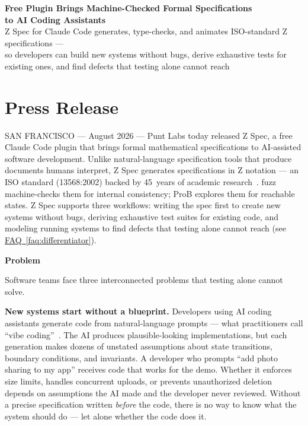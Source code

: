 \documentclass[11pt,letterpaper]{article}
\newcommand{\prsection}[1]{%
  \vspace{1em}%
  {\large\bfseries\color{SectionBlue}#1}%
  \vspace{0.3em}\par%
}
\newcommand{\faqref}[1]{\hyperref[#1]{FAQ~\ref*{#1}}}
\begin{document}
\begin{center}
  {\LARGE\bfseries\color{SectionBlue} Free Plugin Brings Machine-Checked Formal Specifications\\to AI Coding Assistants} \\[0.8em]
  {\large\color{AccentGray} Z Spec for Claude Code generates, type-checks, and animates ISO-standard Z specifications ---} \\[0.3em]
  {\large\color{AccentGray} so developers can build new systems without bugs, derive exhaustive tests for existing ones, and find defects that testing alone cannot reach}
\end{center}

\vspace{0.5em}


\section*{Press Release}

SAN FRANCISCO --- August 2026 --- Punt Labs today released Z Spec, a free Claude Code plugin that brings formal mathematical specifications to AI-assisted software development. Unlike natural-language specification tools that produce documents humans interpret, Z Spec generates specifications in Z notation --- an ISO standard (13568:2002) backed by 45~years of academic research~\cite{iso13568,spivey1992zrm}. fuzz machine-checks them for internal consistency; ProB explores them for reachable states. Z Spec supports three workflows: writing the spec first to create new systems without bugs, deriving exhaustive test suites for existing code, and modeling running systems to find defects that testing alone cannot reach (see \faqref{faq:differentiator}).

\prsection{Problem}

Software teams face three interconnected problems that testing alone cannot solve.

\textbf{New systems start without a blueprint.} Developers using AI coding assistants generate code from natural-language prompts --- what practitioners call ``vibe coding''~\cite{abebe2026sdd}. The AI produces plausible-looking implementations, but each generation makes dozens of unstated assumptions about state transitions, boundary conditions, and invariants. A developer who prompts ``add photo sharing to my app'' receives code that works for the demo. Whether it enforces size limits, handles concurrent uploads, or prevents unauthorized deletion depends on assumptions the AI made and the developer never reviewed. Without a precise specification written \emph{before} the code, there is no way to know what the system should do --- let alone whether the code does it.
\end{document}
